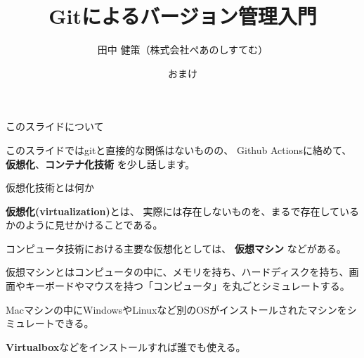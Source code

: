 \documentclass[12pt, unicode]{beamer}
\title{Gitによるバージョン管理入門}
\author{田中 健策（株式会社ぺあのしすてむ）}
\date[2019/10/30]{おまけ}
\begin{document}
\frame{\maketitle}

\begin{frame}{このスライドについて}

このスライドではgitと直接的な関係はないものの、
Github Actionsに絡めて、
\textbf{仮想化}、\textbf{コンテナ化技術}
を少し話します。

\end{frame}

\begin{frame}{仮想化技術とは何か}

\textbf{仮想化(virtualization)}とは、
実際には存在しないものを、まるで存在しているかのように見せかけることである。

コンピュータ技術における主要な仮想化としては、
\textbf{仮想マシン}
などがある。

\vspace{1.0\baselineskip}

仮想マシンとはコンピュータの中に、メモリを持ち、ハードディスクを持ち、画面やキーボードやマウスを持つ「コンピュータ」を丸ごとシミュレートする。

Macマシンの中にWindowsやLinuxなど別のOSがインストールされたマシンをシミュレートできる。

\textbf{Virtualbox}などをインストールすれば誰でも使える。

\end{frame}
\end{document}
